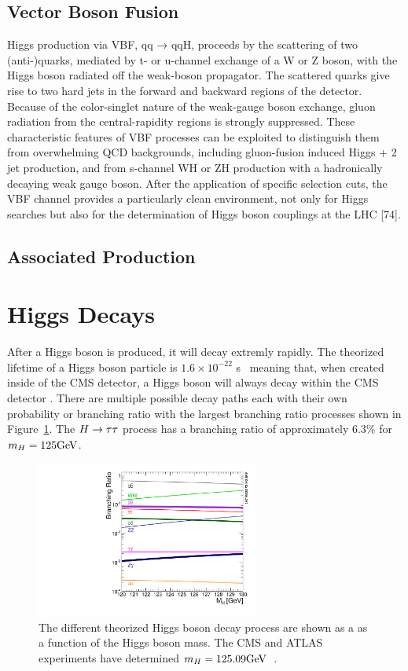 \subsection{Vector Boson Fusion}
Higgs production via VBF, qq → qqH, proceeds by the scattering of two (anti-)quarks, mediated by t- or u-channel exchange of a W or Z boson, with the Higgs boson radiated off the weak-boson propagator. The scattered quarks give rise to two hard jets in the forward and backward regions of the detector. Because of the color-singlet nature of the weak-gauge boson exchange, gluon radiation from the central-rapidity regions is strongly suppressed. These characteristic features of VBF processes can be exploited to distinguish them from overwhelming QCD backgrounds, including gluon-fusion induced Higgs + 2 jet production, and from s-channel WH or ZH production with a hadronically decaying weak gauge boson. After the application of specific selection cuts, the VBF channel provides a particularly clean environment, not only for Higgs searches but also for the determination of Higgs boson couplings at the LHC [74].

\subsection{Associated Production}

\section{Higgs Decays}

After a Higgs boson is produced, it will decay extremly rapidly. The theorized lifetime of a Higgs
boson particle is $1.6 \times 10^{-22}$ s~\cite{Dittmaier:2012vm} meaning that, when created
inside of the CMS detector, a Higgs boson will always decay
within the CMS detector . There are multiple possible decay
paths each with their own probability or branching ratio with the largest branching ratio
processes shown in Figure~\ref{fig:higgs_decay}. The $H\to\tau\tau$ process has a branching
ratio of approximately 6.3\% for $m_{H} = 125\mathrm{GeV}$.


\begin{figure}[htbp]
\centering
     \includegraphics[width=0.65\textwidth]{phenomology_of_processes/plots/SMHiggsBR_YR4-square.pdf}
     \caption{
The different theorized Higgs boson decay process are shown as a 
as a function of the Higgs boson mass.
The CMS and ATLAS experiments have determined $m_{H} = 125.09\mathrm{GeV}$~\cite{Aad:2015zhl}.
     }
     \label{fig:higgs_decay}
\end{figure}



